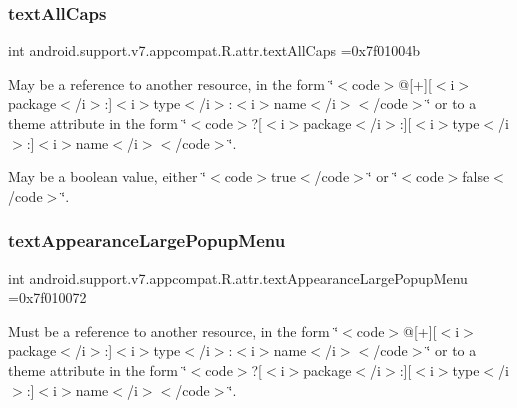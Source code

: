 \subsubsection{\texorpdfstring{text\+All\+Caps}{textAllCaps}}
{\footnotesize\ttfamily int android.\+support.\+v7.\+appcompat.\+R.\+attr.\+text\+All\+Caps =0x7f01004b\hspace{0.3cm}{\ttfamily [static]}}

May be a reference to another resource, in the form \char`\"{}$<$code$>$@\mbox{[}+\mbox{]}\mbox{[}$<$i$>$package$<$/i$>$\+:\mbox{]}$<$i$>$type$<$/i$>$\+:$<$i$>$name$<$/i$>$$<$/code$>$\char`\"{} or to a theme attribute in the form \char`\"{}$<$code$>$?\mbox{[}$<$i$>$package$<$/i$>$\+:\mbox{]}\mbox{[}$<$i$>$type$<$/i$>$\+:\mbox{]}$<$i$>$name$<$/i$>$$<$/code$>$\char`\"{}. 

May be a boolean value, either \char`\"{}$<$code$>$true$<$/code$>$\char`\"{} or \char`\"{}$<$code$>$false$<$/code$>$\char`\"{}. \mbox{\label{classandroid_1_1support_1_1v7_1_1appcompat_1_1R_1_1attr_abd33adb2cdd277a5d91cc85a8800492b}} 
\subsubsection{\texorpdfstring{text\+Appearance\+Large\+Popup\+Menu}{textAppearanceLargePopupMenu}}
{\footnotesize\ttfamily int android.\+support.\+v7.\+appcompat.\+R.\+attr.\+text\+Appearance\+Large\+Popup\+Menu =0x7f010072\hspace{0.3cm}{\ttfamily [static]}}

Must be a reference to another resource, in the form \char`\"{}$<$code$>$@\mbox{[}+\mbox{]}\mbox{[}$<$i$>$package$<$/i$>$\+:\mbox{]}$<$i$>$type$<$/i$>$\+:$<$i$>$name$<$/i$>$$<$/code$>$\char`\"{} or to a theme attribute in the form \char`\"{}$<$code$>$?\mbox{[}$<$i$>$package$<$/i$>$\+:\mbox{]}\mbox{[}$<$i$>$type$<$/i$>$\+:\mbox{]}$<$i$>$name$<$/i$>$$<$/code$>$\char`\"{}. \mbox{\label{classandroid_1_1support_1_1v7_1_1appcompat_1_1R_1_1attr_ae0a52709ab8a3d80bcf2f6c11eea15f4}} 

